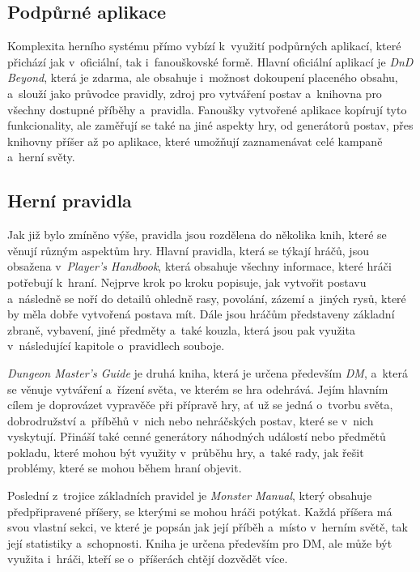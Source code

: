 \subsection{Podpůrné aplikace}
\label{subsec:dnd_apps}

Komplexita herního systému \dnd{} přímo vybízí k~využití podpůrných aplikací, které přichází jak v~oficiální, tak i~fanouškovské formě. Hlavní oficiální aplikací je \textit{DnD Beyond}, která je zdarma, ale obsahuje i~možnost dokoupení placeného obsahu, a~slouží jako průvodce pravidly, zdroj pro vytváření postav a~knihovna pro všechny dostupné příběhy a~pravidla. Fanoušky vytvořené aplikace kopírují tyto funkcionality, ale zaměřují se také na jiné aspekty hry, od generátorů postav, přes knihovny příšer až po aplikace, které umožňují zaznamenávat celé kampaně a~herní světy. \cite{dnd_beyond_app}

\subsection{Herní pravidla}
\label{subsec:dnd_rules}

Jak již bylo zmíněno výše, pravidla \dnd{} jsou rozdělena do několika knih, které se věnují různým aspektům hry. Hlavní pravidla, která se týkají hráčů, jsou obsažena v~\textit{Player's Handbook}, která obsahuje všechny informace, které hráči potřebují k~hraní. Nejprve krok po kroku popisuje, jak vytvořit postavu a~následně se noří do detailů ohledně rasy, povolání, zázemí a~jiných rysů, které by měla dobře vytvořená postava mít. Dále jsou hráčům představeny základní zbraně, vybavení, jiné předměty a~také kouzla, která jsou pak využita v~následující kapitole o~pravidlech souboje.

\textit{Dungeon Master's Guide} je druhá kniha, která je určena především \textit{DM}, a~která se věnuje vytváření a~řízení světa, ve kterém se hra odehrává. Jejím hlavním cílem je doprovázet vypravěče při přípravě hry, ať už se jedná o~tvorbu světa, dobrodružství a~příběhů v~nich nebo nehráčských postav, které se v~nich vyskytují. Přináší také cenné generátory náhodných událostí nebo předmětů pokladu, které mohou být využity v~průběhu hry, a~také rady, jak řešit problémy, které se mohou během hraní objevit.

Poslední z~trojice základních pravidel je \textit{Monster Manual}, který obsahuje předpřipravené příšery, se kterými se mohou hráči potýkat. Každá příšera má svou vlastní sekci, ve které je popsán jak její příběh a~místo v~herním světě, tak její statistiky a~schopnosti. Kniha je určena především pro DM, ale může být využita i~hráči, kteří se o~příšerách chtějí dozvědět více.

